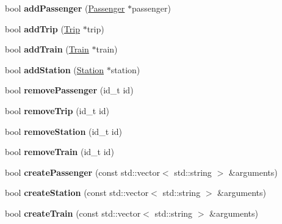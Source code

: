 \begin{DoxyCompactItemize}
\item 
\mbox{\label{classSystem_a933891c246bf870518f334ea5666b95c}} 
bool {\bfseries add\+Passenger} (\mbox{\hyperlink{classPassenger}{Passenger}} $\ast$passenger)
\item 
\mbox{\label{classSystem_ad019d3f8d30be9b2f57842512f0393ed}} 
bool {\bfseries add\+Trip} (\mbox{\hyperlink{classTrip}{Trip}} $\ast$trip)
\item 
\mbox{\label{classSystem_a8022adc1c1f212c138ca9da7995bb422}} 
bool {\bfseries add\+Train} (\mbox{\hyperlink{classTrain}{Train}} $\ast$train)
\item 
\mbox{\label{classSystem_abc5bda005d56392c66914ddd4f96e725}} 
bool {\bfseries add\+Station} (\mbox{\hyperlink{classStation}{Station}} $\ast$station)
\item 
\mbox{\label{classSystem_af31acdda711986978533367ce3a64276}} 
bool {\bfseries remove\+Passenger} (id\+\_\+t id)
\item 
\mbox{\label{classSystem_ae802cde42ae56b50adc02c76920e9001}} 
bool {\bfseries remove\+Trip} (id\+\_\+t id)
\item 
\mbox{\label{classSystem_ae582dd1c79cbd879ba1fbec5ceaab2fb}} 
bool {\bfseries remove\+Station} (id\+\_\+t id)
\item 
\mbox{\label{classSystem_acf1d845cdb88b43143b3f738214e866b}} 
bool {\bfseries remove\+Train} (id\+\_\+t id)
\item 
\mbox{\label{classSystem_a9e71afb2e06ab9a315436b17dfc04d69}} 
bool {\bfseries create\+Passenger} (const std\+::vector$<$ std\+::string $>$ \&arguments)
\item 
\mbox{\label{classSystem_a132bfbf3cfb3aab1e9dad1bf1b2710b4}} 
bool {\bfseries create\+Station} (const std\+::vector$<$ std\+::string $>$ \&arguments)
\item 
\mbox{\label{classSystem_aeead09c522819325eb24ff92d3a37404}} 
bool {\bfseries create\+Train} (const std\+::vector$<$ std\+::string $>$ \&arguments)

\end{DoxyCompactItemize}
